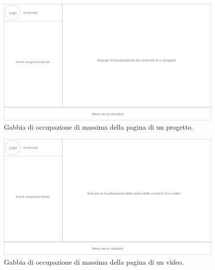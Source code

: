 \begin{figure}[H]
	\centering
	\caption{Gabbia di occupazione di massima della pagina di un progetto.}
	\label{fig:gabbie-massima:project}
	\includegraphics[width=\textwidth]{images/gabbie-di-massima/Progetto}
\end{figure}

\begin{figure}[H]
	\centering
	\caption{Gabbia di occupazione di massima della pagina di un video.}
	\label{fig:gabbie-massima:video}
	\includegraphics[width=\textwidth]{images/gabbie-di-massima/Video}
\end{figure}
